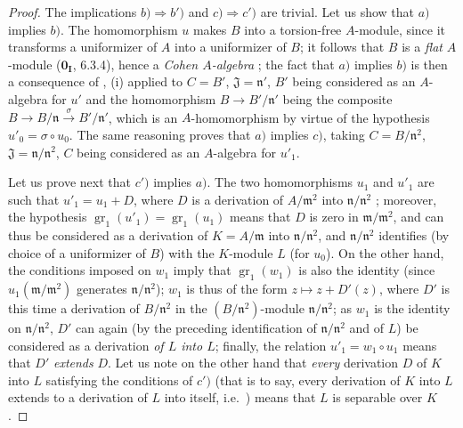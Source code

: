 \begin{proof}
The implications $b)\Rightarrow b')$ and $c)\Rightarrow c')$ are trivial.
Let us show that $a)$ implies $b)$.
The homomorphism $u$ makes $B$ into a torsion-free $A$-module, since it transforms a uniformizer of $A$ into a uniformizer of $B$; it follows that $B$ is a \emph{flat} $A$-module ($\mathbf{0_I}$, 6.3.4), hence a \emph{Cohen $A$-algebra} ; the fact that $a)$ implies $b)$ is then a consequence of , (i) applied to $C=B'$, $\mathfrak{J}=\mathfrak{n}'$, $B'$ being considered as an $A$-algebra for $u'$ and the homomorphism $B\to B'/\mathfrak{n}'$ being the composite $B\to B/\mathfrak{n}\xrightarrow{\sigma} B'/\mathfrak{n}'$, which is an $A$-homomorphism by virtue of the hypothesis $u'_0=\sigma\circ u_0$.
The same reasoning proves that $a)$ implies $c)$, taking $C=B/\mathfrak{n}^2$, $\mathfrak{J}=\mathfrak{n}/\mathfrak{n}^2$, $C$ being considered as an $A$-algebra for $u'_1$.

Let us prove next that $c')$ implies $a)$.
The two homomorphisms $u_1$ and $u'_1$ are such that $u'_1=u_1+D$, where $D$ is a derivation of $A/\mathfrak{m}^2$ into $\mathfrak{n}/\mathfrak{n}^2$ ; moreover, the hypothesis $\operatorname{gr}_1(u'_1)=\operatorname{gr}_1(u_1)$ means that $D$ is zero in $\mathfrak{m}/\mathfrak{m}^2$, and can thus be considered as a derivation of $K=A/\mathfrak{m}$ into $\mathfrak{n}/\mathfrak{n}^2$, and $\mathfrak{n}/\mathfrak{n}^2$ identifies (by choice of a uniformizer of $B$) with the $K$-module $L$ (for $u_0$).
On the other hand, the conditions imposed on $w_1$ imply that $\operatorname{gr}_1(w_1)$ is also the identity (since $u_1(\mathfrak{m}/\mathfrak{m}^2)$ generates $\mathfrak{n}/\mathfrak{n}^2$);
$w_1$ is thus of the form $z\mapsto z+D'(z)$, where $D'$ is this time a derivation of $B/\mathfrak{n}^2$ in the $(B/\mathfrak{n}^2)$-module $\mathfrak{n}/\mathfrak{n}^2$; as $w_1$ is the identity on $\mathfrak{n}/\mathfrak{n}^2$, $D'$ can again (by the preceding identification of $\mathfrak{n}/\mathfrak{n}^2$ and of $L$) be considered as a derivation \emph{of $L$ into $L$};
finally, the relation $u'_1=w_1\circ u_1$ means that $D'$ \emph{extends} $D$.
Let us note on the other hand that \emph{every} derivation $D$ of $K$ into $L$ satisfying the conditions of $c')$ (that is to say, every derivation of $K$ into $L$ extends to a derivation of $L$ into itself, i.e.\ ) means that $L$ is separable over $K$.


\end{proof}
